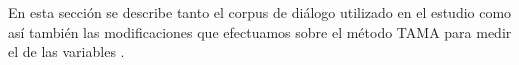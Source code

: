 En esta sección se describe tanto el corpus de diálogo utilizado en el estudio como así también las modificaciones que efectuamos sobre el método TAMA para medir el \entrainment de las variables \ap.







